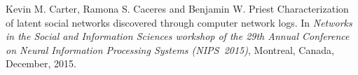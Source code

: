\documentclass[10pt]{article}
\begin{document}
\begin{bibenum}

\item {}

\item {}

\item Kevin M. Carter, Ramona S. Caceres and Benjamin W. Priest
Characterization of latent social networks discovered through computer network logs.
In \emph{Networks in the Social and Information Sciences workshop of the 29th Annual Conference on Neural Information Processing Systems (NIPS~2015)},
Montreal, Canada,
December, 2015.

\item {}

\end{bibenum}
\end{document}
